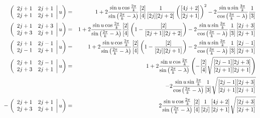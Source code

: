 \documentclass[11pt]{article}
\begin{document}
\begin{eqnarray}
   \left. \left( \begin{array}{cc} 2 j +1 & 2 j +1 \\ 2 j +1  & 2 j +1 \end{array} \right| u  \right) &=&  
   1 
   + 2\frac{\sin u \cos{2\pi \over k}}{\sin\left({2\pi \over k}-\lambda\right)}   \frac{[2]}{[4]}\frac{1}{[2j][2j+2]}\left( {[4j+2] \over [2j+1]} \right)^2  
  - 2\frac{\sin u \sin{3\pi \over k}}{\cos\left({3\pi \over k}-\lambda\right)} \frac{1}{[3]}
   \nonumber \\
      \left. \left( \begin{array}{cc} 2 j +1 & 2 j + 3 \\ 2 j + 3  & 2 j +1 \end{array} \right| u  \right) &=&  
   1 
   + 2\frac{\sin u \cos{2\pi \over k}}{\sin\left({2\pi \over k}-\lambda\right)}   \frac{[2]}{[4]}\left(1-\frac{[2]}{[2j+1][2j+2]}\right) 
  - 2\frac{\sin u \sin{3\pi \over k}}{\cos\left({3\pi \over k}-\lambda\right)} \frac{1}{[3]}\frac{[2j+3]}{[2j+1]}
   \nonumber \\
      \left. \left( \begin{array}{cc} 2 j +1 & 2 j - 1 \\ 2 j -1  & 2 j +1 \end{array} \right| u  \right) &=&  
   1 
   + 2\frac{\sin u \cos{2\pi \over k}}{\sin{\left({2\pi \over k}-\lambda\right)}}   \frac{[2]}{[4]}\left(1-\frac{[2]}{[2j][2j+1]}\right) 
  - 2\frac{\sin u \sin{3\pi \over k}}{\cos\left({3\pi \over k}-\lambda\right)} \frac{1}{[3]}\frac{[2j-1]}{[2j+1]}
   \nonumber \\
      \left. \left( \begin{array}{cc} 2 j +1 & 2 j - 1 \\ 2 j +3  & 2 j +1 \end{array} \right| u  \right) &=&  
   1 
   + 2\frac{\sin u \cos{2\pi \over k}}{\sin{\left({2\pi \over k}-\lambda\right)}} \left(- \frac{[2]}{[4]} \sqrt{[2j-1][2j+3] \over [2j+1][2j+1]}\right) \nonumber \\ & &
  - 2\frac{\sin u \sin{3\pi \over k}}{\cos\left({3\pi \over k}-\lambda\right)}  \frac{1}{[3]}\sqrt{[2j-1][2j+3] \over [2j+1][2j+1]}
   \nonumber \\
    -  \left. \left( \begin{array}{cc} 2 j +1 & 2 j + 1 \\ 2 j +3  & 2 j +1 \end{array} \right| u  \right) &=&  
    2\frac{\sin u \cos{2\pi \over k}}{\sin{\left({2\pi \over k}-\lambda\right)}} \frac{[2]}{[4]}\frac{1}{[2j]}\frac{[4j+2]}{[2j+1]}\sqrt{[2j+3] \over[2j+1]} \nonumber \\ & &  

\end{eqnarray}
\end{document}
